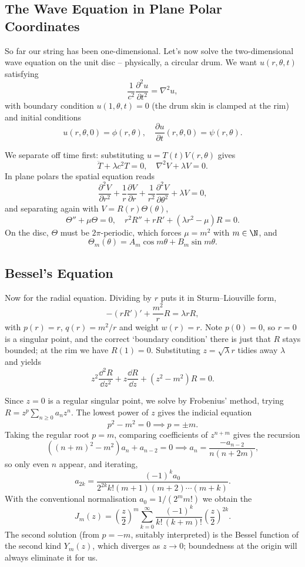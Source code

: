 \subsection{The Wave Equation in Plane Polar Coordinates}

So far our string has been one-dimensional. Let's now solve the two-dimensional wave equation on the unit disc -- physically, a circular drum. We want $u(r, \theta, t)$ satisfying
$$
\frac{1}{c^2} \frac{\partial^2 u}{\partial t^2} = \nabla^2 u,
$$
with boundary condition $u(1, \theta, t) = 0$ (the drum skin is clamped at the rim) and initial conditions
$$
u(r, \theta, 0) = \phi(r, \theta), \quad \frac{\partial u}{\partial t}(r, \theta, 0) = \psi(r, \theta).
$$

We separate off time first: substituting $u = T(t) V(r, \theta)$ gives
$$
\ddot{T} + \lambda c^2 T = 0, \quad \nabla^2 V + \lambda V = 0.
$$
In plane polars the spatial equation reads
$$
\frac{\partial^2 V}{\partial r^2} + \frac{1}{r}\frac{\partial V}{\partial r} + \frac{1}{r^2} \frac{\partial^2 V}{\partial \theta^2} + \lambda V = 0,
$$
and separating again with $V = R(r) \Theta(\theta)$,
$$
\Theta'' + \mu \Theta = 0, \quad r^2 R'' + r R' + (\lambda r^2 - \mu) R = 0.
$$
On the disc, $\Theta$ must be $2\pi$-periodic, which forces $\mu = m^2$ with $m \in \N$, and
$$
\Theta_m(\theta) = A_m \cos m \theta + B_m \sin m \theta.
$$

\subsection{Bessel's Equation}

Now for the radial equation. Dividing by $r$ puts it in Sturm--Liouville form,
$$
-\left(r R'\right)' + \frac{m^2}{r} R = \lambda r R,
$$
with $p(r) = r$, $q(r) = m^2/r$ and weight $w(r) = r$. Note $p(0) = 0$, so $r = 0$ is a singular point, and the correct `boundary condition' there is just that $R$ stays bounded; at the rim we have $R(1) = 0$. Substituting $z = \sqrt{\lambda} r$ tidies away $\lambda$ and yields 
$$
z^2 \frac{\dd^2 R}{\dd z^2} + z \frac{\dd R}{\dd z} + (z^2 - m^2) R = 0.
$$

Since $z = 0$ is a regular singular point, we solve by Frobenius' method, trying $R = z^p \sum_{n \geq 0} a_n z^n$. The lowest power of $z$ gives the indicial equation
$$
p^2 - m^2 = 0 \implies p = \pm m.
$$
Taking the regular root $p = m$, comparing coefficients of $z^{n + m}$ gives the recursion
$$
\left((n + m)^2 - m^2\right) a_n + a_{n - 2} = 0 \implies a_n = \frac{-a_{n - 2}}{n (n + 2m)},
$$
so only even $n$ appear, and iterating,
$$
a_{2k} = \frac{(-1)^k a_0}{2^{2k} k! (m + 1)(m+2)\cdots(m + k)}.
$$
With the conventional normalisation $a_0 = 1/(2^m m!)$ we obtain the 
$$
J_m(z) = \left(\frac{z}{2}\right)^m \sum_{k = 0}^{\infty} \frac{(-1)^k}{k! \, (k + m)!} \left(\frac{z}{2}\right)^{2k}.
$$
The second solution (from $p = -m$, suitably interpreted) is the Bessel function of the second kind $Y_m(z)$, which diverges as $z \rightarrow 0$; boundedness at the origin will always eliminate it for us.

